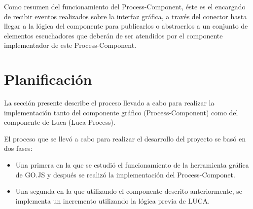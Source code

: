 Como resumen del funcionamiento del Process-Component, éste es el encargado de recibir eventos realizados sobre la interfaz gráfica, a través del conector hasta llegar a la lógica del componente para publicarlos o abstraerlos a un conjunto de elementos escuchadores que deberán de ser atendidos por el componente implementador de este Process-Component.


\section{Planificación}


	La sección presente describe el proceso llevado a cabo para realizar la implementación tanto del componente gráfico (Process-Component) como del componente de Luca (Luca-Process).

	\vspace{5mm}

	El proceso que se llevó a cabo para realizar el desarrollo del proyecto se basó en dos fases:
	
	\begin{itemize}
		\item  Una primera en la que se estudió el funcionamiento de la herramienta gráfica de GO.JS y después se realizó la implementación del Process-Componet.
		\item  Una segunda en la que utilizando el componente descrito anteriormente, se implementa un incremento utilizando la lógica previa de LUCA.

	\end{itemize}

